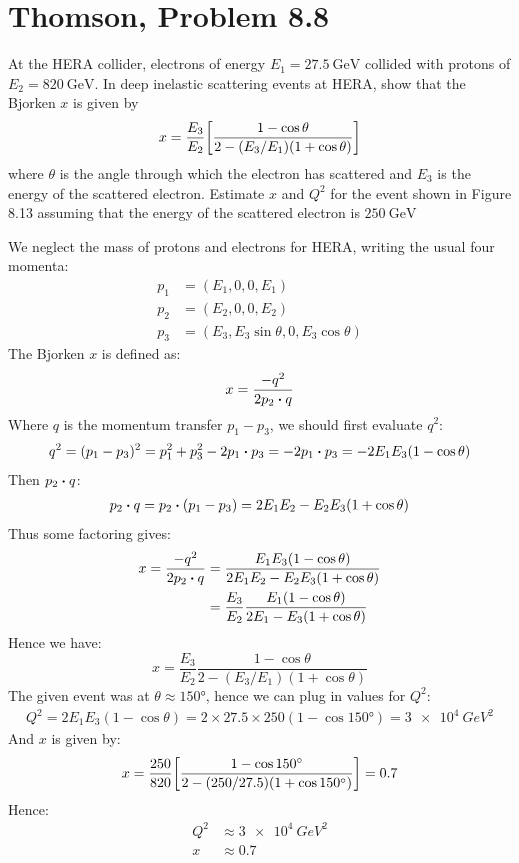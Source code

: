 \documentclass[12pt]{article}
\begin{document}
\section{Thomson, Problem 8.8}
\begin{problem}
  At the HERA collider, electrons of energy $E_1=\SI{27.5}{\GeV}$ collided with protons of $E_2=\SI{820}{\GeV}$. In deep inelastic scattering events at HERA, show that the Bjorken $x$ is given by
  \begin{align*}
    x=\frac{E_3}{E_2}\qty[\frac{1-\cos\theta}{2-(E_3/E_1)(1+\cos\theta)}]
  \end{align*}
  where $\theta$ is the angle through which the electron has scattered and $E_3$ is the energy of the scattered electron. Estimate $x$ and $Q^2$ for the event shown in Figure 8.13 assuming that the energy of the scattered electron is $\SI{250}{\GeV}$
\end{problem}
We neglect the mass of protons and electrons for HERA, writing the usual four momenta:
\begin{align*}
  p_1&=(E_1,0,0,E_1)\\
  p_2&=(E_2,0,0,E_2)\\
  p_3&=(E_3,E_3\sin\theta,0,E_3\cos\theta)
\end{align*}
The Bjorken $x$ is defined as:
\begin{align*}
  x=\frac{-q^2}{2p_2\vdot q}
\end{align*}
Where $q$ is the momentum transfer $p_1-p_3$, we should first evaluate $q^2$:
\begin{align*}
  q^2=(p_1-p_3)^2
  =p_1^2+p_3^2-2p_1\vdot p_3
  =-2p_1\vdot p_3
  =-2E_1E_3(1-\cos\theta)
\end{align*}
Then $p_2\vdot q$:
\begin{align*}
  p_2\vdot q=p_2\vdot(p_1-p_3)=2E_1E_2-E_2E_3(1+\cos\theta)
\end{align*}
Thus some factoring gives:
\begin{align*}
  x=\frac{-q^2}{2p_2\vdot q}
  &=\frac{E_1E_3(1-\cos\theta)}{2E_1E_2-E_2E_3(1+\cos\theta)}\\
  &=\frac{E_3}{E_2}\frac{E_1(1-\cos\theta)}{2E_1-E_3(1+\cos\theta)}
\end{align*}
Hence we have:
\begin{equation}
  \label{eq:p6a}
  \boxed{x=
    \frac{E_3}{E_2}\frac{1-\cos\theta}{2-(E_3/E_1)(1+\cos\theta)}}
\end{equation}
The given event was at $\theta\approx\ang{150}$, hence we can plug in values for $Q^2$:
\begin{align*}
  Q^2=2E_1E_3(1-\cos\theta)=2\times27.5\times250(1-\cos\ang{150})
  =\SI{3e4}{GeV^2}
\end{align*}
And $x$ is given by:
\begin{align*}
  x=\frac{250}{820}\qty[\frac{1-\cos\ang{150}}{2-(250/27.5)(1+\cos\ang{150})}]
  =0.7
\end{align*}
Hence:
\begin{equation}
  \label{eq:p6b}
  \boxed{
    \begin{aligned}
      Q^2&\approx\SI{3e4}{GeV^2}\\
      x&\approx0.7
    \end{aligned}
  }
\end{equation}
\newpage
\end{document}
